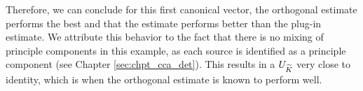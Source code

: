 Therefore, we can conclude for this first canonical vector, the orthogonal estimate
performs the best and that the \iccap estimate performs better than the plug-in
estimate. We attribute this behavior to the fact that there is no mixing of principle
components in this example, as each source is identified as a principle component (see
Chapter \ref{sec:chpt_cca_det}). This results in a $U_{\widetilde{K}}$ very close to identity, which
is when the orthogonal estimate is known to perform well.

\begin{figure}
  \begin{center}
\end{center}
\end{figure}
